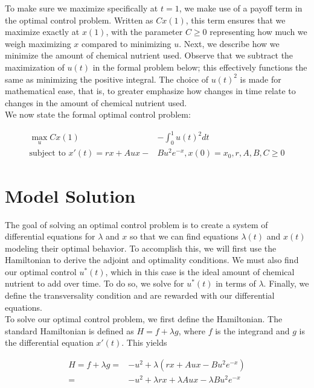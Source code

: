 \documentclass[10pt]{article}
\theoremstyle{exmp}
\begin{document}
\noindent To make sure we maximize specifically at $t = 1$, we make use of a payoff term in the optimal control problem. Written as $Cx(1)$, this term ensures that we maximize exactly at $x(1)$, with the parameter $C \geq 0$ representing how much we weigh maximizing $x$ compared to minimizing $u$. Next, we describe how we minimize the amount of chemical nutrient used. Observe that we subtract the maximization of $u(t)$ in the formal problem below; this effectively functions the same as minimizing the positive integral. The choice of $u(t)^2$ is made for mathematical ease, that is, to greater emphasize how changes in time relate to changes in the amount of chemical nutrient used. \\ 

\noindent We now state the formal optimal control problem:

\begin{align*}
    \max_u Cx(1) &- \int_0^1 u(t)^2 dt \\
    \text{subject to }  x'(t) = rx + Aux - &Bu^2e^{-x}, x(0) = x_0, r, A,B,C \geq 0
\end{align*}



\section{Model Solution} 
\label{sec:modelsolution} 	

The goal of solving an optimal control problem is to create a system of differential equations for $\lambda$ and $x$ so that we can find equations $\lambda(t)$ and $x(t)$ modeling their optimal behavior. To accomplish this, we will first use the Hamiltonian to derive the adjoint and optimality conditions. We must also find our optimal control $u^*(t)$, which in this case is the ideal amount of chemical nutrient to add over time. To do so, we solve for $u^*(t)$ in terms of $\lambda$. Finally, we define the transversality condition and are rewarded with our differential equations. \\

\noindent To solve our optimal control problem, we first define the Hamiltonian. The standard Hamiltonian is defined as $H = f + \lambda g$, where $f$ is the integrand and $g$ is the differential equation $x'(t)$. This yields

\begin{align}
    H = f+ \lambda g =& -u^2 + \lambda(rx + Aux - Bu^2e^{-x}) \\
    =& -u^2 + \lambda rx + \lambda Aux - \lambda Bu^2e^{-x} 
\end{align}
\end{document}
